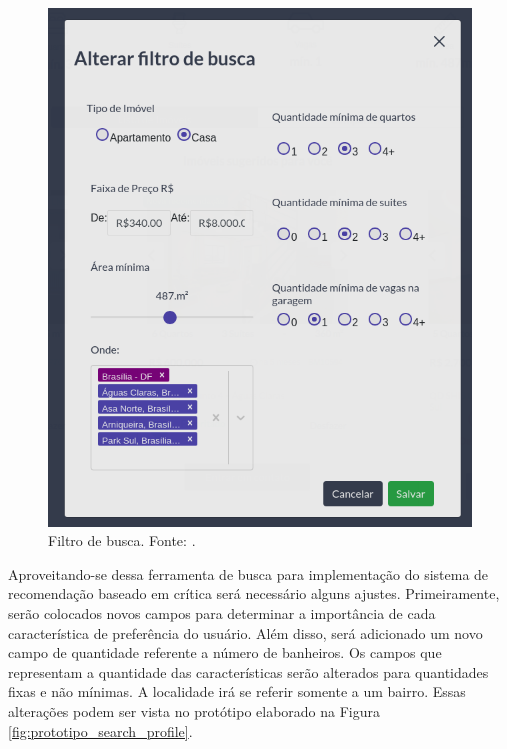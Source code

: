 \begin{figure}[H]
    \centering
    \includegraphics[scale=0.6]{figuras/proposta/filtro_busca.png}
    \caption[Filtro de busca]{Filtro de busca. Fonte: \cite{Liva:2019}.}
    \label{fig:filtro_busca}
\end{figure}

Aproveitando-se dessa ferramenta de busca para implementação do sistema de recomendação baseado em crítica será necessário alguns ajustes. Primeiramente, serão colocados novos campos para determinar a importância de cada característica de preferência do usuário. Além disso, será adicionado um novo campo de quantidade referente a número de banheiros. Os campos que representam a quantidade das características serão alterados para quantidades fixas e não mínimas. A localidade irá se referir somente a um bairro. Essas alterações podem ser vista no protótipo elaborado na Figura \ref{fig:prototipo_search_profile}.

